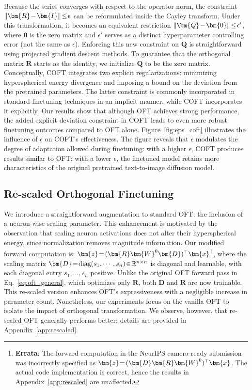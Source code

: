 Because the series converges with respect to the operator norm, the constraint $\thickmuskip=2mu \medmuskip=2mu\|\bm{R}-\bm{I}\|\leq\epsilon$ can be reformulated inside the Cayley transform. Under this transformation, it becomes an equivalent restriction $\thickmuskip=2mu \medmuskip=2mu \|\bm{Q}-\bm{0}\|\leq\epsilon'$, where $\bm{0}$ is the zero matrix and $\epsilon'$ serves as a distinct hyperparameter controlling error (not the same as $\epsilon$). Enforcing this new constraint on $\bm{Q}$ is straightforward using projected gradient descent methods. To guarantee that the orthogonal matrix $\bm{R}$ starts as the identity, we initialize $\bm{Q}$ to be the zero matrix. Conceptually, COFT integrates two explicit regularizations: minimizing hyperspherical energy divergence and imposing a bound on the deviation from the pretrained parameters. The latter constraint is commonly incorporated in standard finetuning techniques in an implicit manner, while COFT incorporates it explicitly. Our results show that although OFT achieves strong performance, the added explicit deviation constraint in COFT leads to even more robust finetuning outcomes compared to OFT alone. Figure~\ref{fig:eps_coft} illustrates the influence of $\epsilon$ on COFT's effectiveness. The figure reveals that $\epsilon$ modulates the degree of adaptation allowed during finetuning: with a higher $\epsilon$, COFT produces results similar to OFT; with a lower $\epsilon$, the finetuned model retains more characteristics of the original pretrained text-to-image diffusion model.

\subsection{Re-scaled Orthogonal Finetuning}

We introduce a straightforward augmentation to standard OFT: the inclusion of a neuron-wise scaling parameter. This enhancement is motivated by the observation that scaling neuron activations does not alter their hyperspherical energy, since normalization removes magnitude information. Our modified forward computation is: $\thickmuskip=2mu \medmuskip=2mu\bm{z}=(\bm{R}\bm{W}^0\bm{D})^\top\bm{x}$\footnote{\textbf{Errata}: The forward computation in the NeurIPS camera-ready submission was incorrectly specified as $\thickmuskip=2mu \medmuskip=2mu\bm{z}=(\bm{D}\bm{R}\bm{W}^0)^\top\bm{x}$. The actual code implementation is correct, hence the results in Appendix~\ref{app:rescaled} are unaffected.}, where the scaling matrix $\thickmuskip=2mu \medmuskip=2mu \bm{D}=\text{diag}(s_1,\cdots,s_n)\in\mathbb{R}^{n\times n}$ is diagonal and learnable, with each diagonal entry $s_1,\ldots,s_n$ positive. Unlike the original OFT forward pass in Eq.~\eqref{eq:oft_general}, which optimizes only $\bm{R}$, both $\bm{D}$ and $\bm{R}$ are now trainable. This re-scaled version enhances OFT's expressiveness with a negligible increase in parameter count. Nonetheless, our experiments focus on the vanilla OFT to isolate the impact of orthogonal transformation. We observe, however, that re-scaled OFT generally performs better; details are provided in Appendix~\ref{app:rescaled}.

